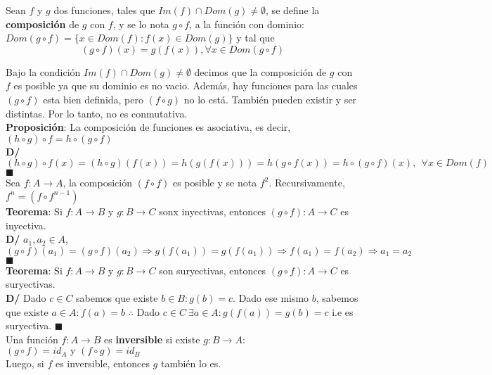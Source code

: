 \documentclass[11pt,a4paper]{article}
\newcommand*{\QEDA}{\null\nobreak\hfill\ensuremath{\blacksquare}}
\begin{document}
\noindent Sean $f$ y $g$ dos funciones, tales que $Im(f) \cap Dom(g) \not = \emptyset$, se define la \textbf{composici\'on} de $g$ con $f$, y se lo nota $g \circ f$, a la funci\'on con dominio: $Dom (g \circ f) = \{ x \in Dom(f) : f(x) \in Dom(g) \}$ y tal que $$(g \circ f) (x) = g(f(x)), \forall x \in Dom(g \circ f)$$

\noindent Bajo la condici\'on $Im(f) \cap Dom(g) \not = \emptyset$ decimos que la composici\'on de $g$ con $f$ es posible ya que su dominio es no vacio. Adem\'as, hay funciones para las cuales $(g\circ f)$ esta bien definida, pero $(f\circ g)$ no lo est\'a. Tambi\'en pueden existir y ser distintas. Por lo tanto, no es conmutativa.\\

\noindent \textbf{Proposici\'on}: La composici\'on de funciones es asociativa, es decir, $(h \circ g) \circ f = h \circ (g \circ f)$\\
\textbf{D/} 
$(h \circ g) \circ f(x)=
(h \circ g) (f(x)) = 
h(g(f(x))) = 
h(g \circ f(x)) =
h \circ (g \circ f) (x),\ \ \forall x \in Dom(f)$ \QEDA\\

\noindent Sea $f: A \rightarrow A$, la composici\'on $(f \circ f)$ es posible y se nota $f^2$. Recursivamente, $f^n = (f \circ f^{n-1})$\\

\noindent \textbf{Teorema}: Si $f: A \rightarrow B$ y $g: B \rightarrow C$ sonx inyectivas, entonces $(g \circ f) : A \rightarrow C$ es inyectiva.\\
\textbf{D/} $a_1, a_2 \in A$, $(g \circ f)(a_1) = (g \circ f)(a_2) \Rightarrow g(f(a_1)) = g(f(a_1)) \Rightarrow f(a_1) = f(a_2) \Rightarrow a_1 = a_2$ \QEDA\\

\noindent \textbf{Teorema}: Si $f: A \rightarrow B$ y $g: B \rightarrow C$ son suryectivas, entonces $(g \circ f) : A \rightarrow C$ es suryectivas.\\
\textbf{D/} Dado $c\in C$ sabemos que existe $b \in B : g(b)=c$. Dado ese mismo $b$, sabemos que existe $a\in A : f(a)=b$ $\therefore$ Dado $c \in C\ \exists a \in A : g(f(a)) = g(b) = c$ i.e es suryectiva. \QEDA\\

\noindent Una funci\'on $f : A \rightarrow B$ es \textbf{inversible} si existe $g : B \rightarrow A :$ $(g\circ f) = id_A \text{  y  } (f\circ g) = id_B$\\
Luego, si $f$ es inversible, entonces $g$ tambi\'en lo es.\\
\end{document}
